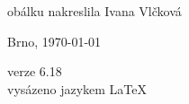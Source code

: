 \vspace*{\fill}
\hspace{10mm}obálku nakreslila Ivana Vlčková\\
\begin{otherlanguage}{czech}
Brno, \today\\
\end{otherlanguage}
verze 6.18\\
vysázeno jazykem \LaTeX
\vspace{2cm}
\newpage